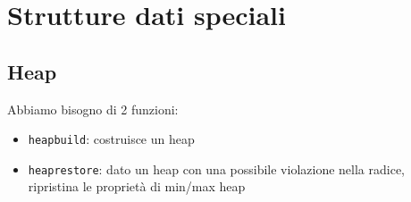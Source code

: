 %









\section{Strutture dati speciali}
\subsection{Heap}\label{heap}
Abbiamo bisogno di 2 funzioni:
\begin{itemize}
	\item \verb|heapbuild|: costruisce un heap
	\item \verb|heaprestore|: dato un heap con una possibile violazione nella radice, ripristina le proprietà di min/max heap
\end{itemize}
